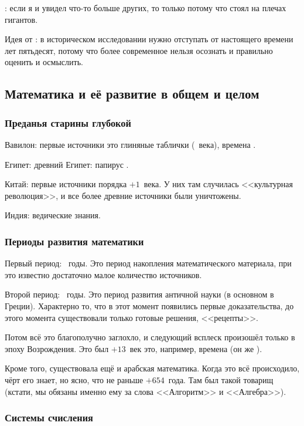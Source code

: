 \documentclass[a4paper,oneside,fleqn,10pt]{article}
\begin{document}
: если я и увидел что-то больше других, то только потому
что стоял на плечах гигантов.

Идея от : в историческом исследовании
нужно отступать от настоящего времени лет пятьдесят, потому что более
современное нельзя осознать и правильно оценить и осмыслить.

\subsection{Математика и её развитие в общем и целом}

\subsubsection{Преданья старины глубокой}

Вавилон: первые источники это глиняные таблички (~века),
времена .

Египет: древний Египет: папирус .

Китай: первые источники порядка $+1$~века. У них там случилась
<<культурная революция>>, и все более древние источники были
уничтожены.

Индия: ведические знания.

\subsubsection{Периоды развития математики}

Первый период: ~годы. Это период накопления
математического материала, при это известно достаточно малое
количество источников.

Второй период: ~годы.  Это период развития античной
науки (в основном в Греции).  Характерно то, что в этот момент
появились первые доказательства, до этого момента существовали только
готовые решения, <<рецепты>>.

Потом всё это благополучно заглохло, и следующий всплеск произошёл
только в эпоху Возрождения.  Это был $+13$~век это, например, времена
 (он же ).

Кроме того, существовала ещё и арабская математика.  Когда это всё
происходило, чёрт его знает, но ясно, что не раньше $+654$~года.  Там
был такой товарищ  (кстати, мы обязаны именно ему за
слова <<Алгоритм>> и <<Алгебра>>).

\subsubsection{Системы счисления}
\end{document}
